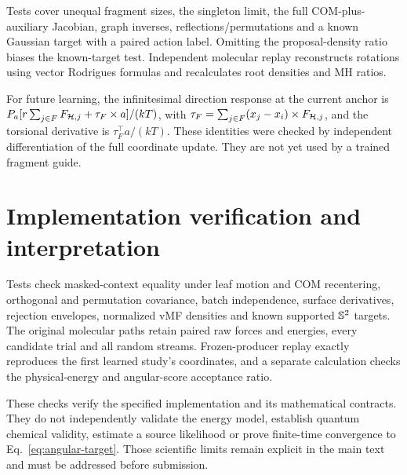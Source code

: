 Tests cover unequal fragment sizes, the singleton limit, the full COM-plus-auxiliary
Jacobian, graph inverses, reflections/permutations and a known Gaussian target with
a paired action label. Omitting the proposal-density ratio biases the known-target
test. Independent molecular replay reconstructs rotations using vector Rodrigues
formulas and recalculates root densities and MH ratios.

For future learning, the infinitesimal direction response at the current anchor
is $P_a[r\sum_{j\in F}F_{\mathcal H,j}+\tau_F\times a]/(kT)$, with
$\tau_F=\sum_{j\in F}(x_j-x_i)\times F_{\mathcal H,j}$, and the torsional derivative is
$\tau_F^\top a/(kT)$. These identities were checked by independent differentiation
of the full coordinate update. They are not yet used by a trained fragment guide.

\section{Implementation verification and interpretation}
Tests check masked-context equality under leaf motion and COM recentering,
orthogonal and permutation covariance, batch independence, surface derivatives,
rejection envelopes, normalized vMF densities and known supported $\mathbb S^2$ targets.
The original molecular paths retain paired raw forces and energies, every
candidate trial and all random streams. Frozen-producer replay exactly reproduces
the first learned study's coordinates, and a separate calculation checks the
physical-energy and angular-score acceptance ratio.

These checks verify the specified implementation and its mathematical contracts.
They do not independently validate the energy model, establish quantum chemical
validity, estimate a source likelihood or prove finite-time convergence to
Eq.~\eqref{eq:angular-target}. Those scientific limits remain explicit in the main
text and must be addressed before submission.
